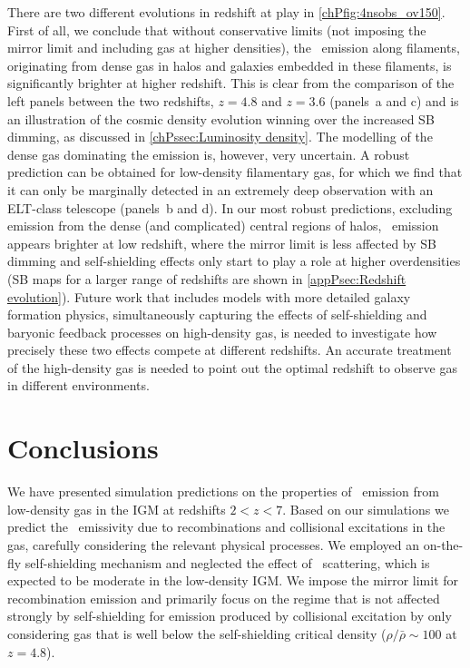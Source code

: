 There are two different evolutions in redshift at play in \cref{chPfig:4nsobs_ov150}. First of all, we conclude that without conservative limits (not imposing the mirror limit and including gas at higher densities), the \lya\ emission along filaments, originating from dense gas in halos and galaxies embedded in these filaments, is significantly brighter at higher redshift. This is clear from the comparison of the left panels between the two redshifts, $z=4.8$ and $z=3.6$ (panels~a and c) and is an illustration of the cosmic density evolution winning over the increased SB dimming, as discussed in \cref{chPssec:Luminosity density}. The modelling of the dense gas dominating the emission is, however, very uncertain. A robust prediction can be obtained for low-density filamentary gas, for which we find that it can only be marginally detected in an extremely deep observation with an ELT-class telescope (panels~b and d). In our most robust predictions, excluding emission from the dense (and complicated) central regions of halos, \lya\ emission appears brighter at low redshift, where the mirror limit is less affected by SB dimming and self-shielding effects only start to play a role at higher overdensities (SB maps for a larger range of redshifts are shown in \cref{appPsec:Redshift evolution}). Future work that includes models with more detailed galaxy formation physics, simultaneously capturing the effects of self-shielding and baryonic feedback processes on high-density gas, is needed to investigate how precisely these two effects compete at different redshifts. An accurate treatment of the high-density gas is needed to point out the optimal redshift to observe gas in different environments.

\section{Conclusions}
\label{chPsec:Conclusions}

We have presented simulation predictions on the properties of \lya\ emission from low-density gas in the IGM at redshifts $2 < z < 7$. Based on our simulations we predict the \lya\ emissivity due to recombinations and collisional excitations in the gas, carefully considering the relevant physical processes. We employed an on-the-fly self-shielding mechanism and neglected the effect of \lya\ scattering, which is expected to be moderate in the low-density IGM. We impose the mirror limit for recombination emission and primarily focus on the regime that is not affected strongly by self-shielding for emission produced by collisional excitation by only considering gas that is well below the self-shielding critical density ($\rho/\bar{\rho} \sim 100$ at $z=4.8$).

